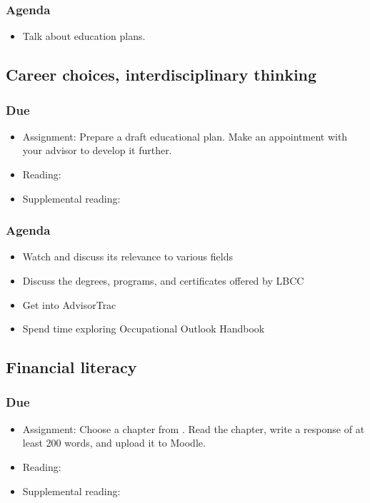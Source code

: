 \documentclass[12pt,article,oneside]{memoir}
\begin{document}
\subsubsection{Agenda}
\begin{itemize}
\item Talk about education plans.
\end{itemize}




\subsection{Career choices, interdisciplinary thinking}
\subsubsection{Due}
\begin{itemize}
 \item Assignment: Prepare a draft educational plan.  Make an appointment with your advisor to develop it further.
 \item Reading: \cite{worksheets}
 \item Supplemental reading: \cite{gen-ed}
\end{itemize}


\subsubsection{Agenda}
\begin{itemize}
 \item Watch \cite{lasers} and discuss its relevance to various fields
 \item Discuss the degrees, programs, and certificates offered by LBCC
 \item Get into AdvisorTrac
 \item Spend time exploring Occupational Outlook Handbook
\end{itemize}



\subsection{Financial literacy}
\subsubsection{Due}
\begin{itemize}
 \item Assignment: Choose a chapter from \cite{everyday}.  Read the chapter, write a response of at least 200 words, and upload it to Moodle.
 \item Reading: \cite{finra}
 \item Supplemental reading: \cite{smart}
\end{itemize}
\end{document}
